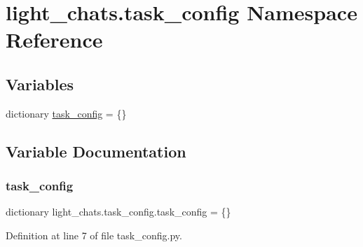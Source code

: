 \hypertarget{namespacelight__chats_1_1task__config}{}\section{light\+\_\+chats.\+task\+\_\+config Namespace Reference}
\label{namespacelight__chats_1_1task__config}
\subsection*{Variables}
\begin{DoxyCompactItemize}
\item 
dictionary \hyperlink{namespacelight__chats_1_1task__config_a117787a05a104ebdaefe05966204fc7e}{task\+\_\+config} = \{\}
\end{DoxyCompactItemize}


\subsection{Variable Documentation}
\mbox{\label{namespacelight__chats_1_1task__config_a117787a05a104ebdaefe05966204fc7e}} 
\subsubsection{\texorpdfstring{task\+\_\+config}{task\_config}}
{\footnotesize\ttfamily dictionary light\+\_\+chats.\+task\+\_\+config.\+task\+\_\+config = \{\}}



Definition at line 7 of file task\+\_\+config.\+py.

